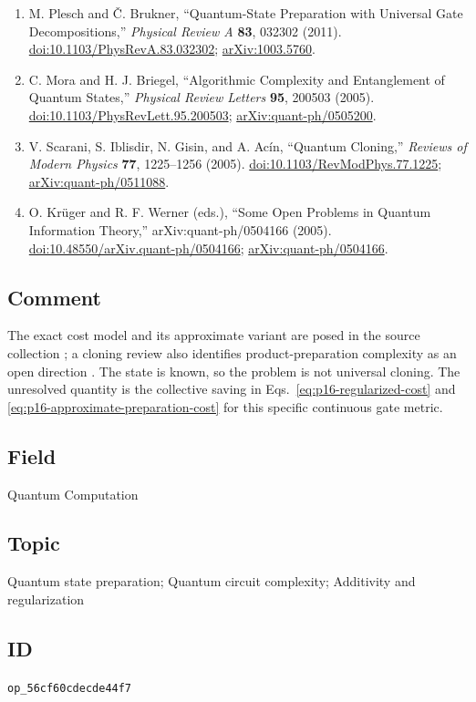\begin{enumerate}[label={},leftmargin=4.8em,labelsep=0.5em]
  \footnotesize
  \item[\textup{[PB11]}]\label{ref:p16-plesch-brukner}
  M. Plesch and Č. Brukner,
  ``Quantum-State Preparation with Universal Gate Decompositions,''
  \emph{Physical Review A} \textbf{83}, 032302 (2011).
  \href{https://doi.org/10.1103/PhysRevA.83.032302}{doi:10.1103/PhysRevA.83.032302};
  \href{https://arxiv.org/abs/1003.5760}{arXiv:1003.5760}.

  \item[\textup{[MB05]}]\label{ref:p16-mora-briegel}
  C. Mora and H. J. Briegel,
  ``Algorithmic Complexity and Entanglement of Quantum States,''
  \emph{Physical Review Letters} \textbf{95}, 200503 (2005).
  \href{https://doi.org/10.1103/PhysRevLett.95.200503}{doi:10.1103/PhysRevLett.95.200503};
  \href{https://arxiv.org/abs/quant-ph/0505200}{arXiv:quant-ph/0505200}.

  \item[\textup{[SIG+05]}]\label{ref:p16-scarani-et-al}
  V. Scarani, S. Iblisdir, N. Gisin, and A. Acín,
  ``Quantum Cloning,''
  \emph{Reviews of Modern Physics} \textbf{77}, 1225--1256 (2005).
  \href{https://doi.org/10.1103/RevModPhys.77.1225}{doi:10.1103/RevModPhys.77.1225};
  \href{https://arxiv.org/abs/quant-ph/0511088}{arXiv:quant-ph/0511088}.

  \item[\textup{[KW05]}]\label{ref:p16-krueger-werner}
  O. Krüger and R. F. Werner (eds.),
  ``Some Open Problems in Quantum Information Theory,''
  arXiv:quant-ph/0504166 (2005).
  \href{https://doi.org/10.48550/arXiv.quant-ph/0504166}{doi:10.48550/arXiv.quant-ph/0504166};
  \href{https://arxiv.org/abs/quant-ph/0504166}{arXiv:quant-ph/0504166}.
\end{enumerate}

\subsection*{Comment}

The exact cost model and its approximate variant are posed in the source
collection ; a cloning review also
identifies product-preparation complexity as an open direction
.  The state is known, so the problem
is not universal cloning.  The unresolved quantity is the collective saving
in Eqs.~\eqref{eq:p16-regularized-cost} and
\eqref{eq:p16-approximate-preparation-cost} for this specific continuous gate
metric.

\subsection*{Field}

Quantum Computation

\subsection*{Topic}

Quantum state preparation; Quantum circuit complexity; Additivity and regularization

\subsection*{ID}

\texttt{op\_56cf60cdecde44f7}
